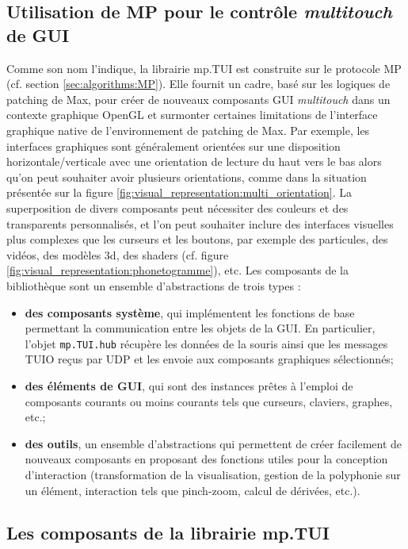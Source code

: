 \subsection{Utilisation de MP pour le contrôle \textit{multitouch} de GUI}

\noindent Comme son nom l'indique, la librairie mp.TUI est construite sur le protocole MP (cf. section \ref{sec:algorithms:MP}). Elle fournit un cadre, basé sur les logiques de patching de Max, pour créer de nouveaux composants \gls{GUI} \textit{multitouch} dans un contexte graphique OpenGL et surmonter certaines limitations de l'interface graphique native de l'environnement de patching de Max. Par exemple, les interfaces graphiques sont généralement orientées sur une disposition horizontale/verticale avec une orientation de lecture du haut vers le bas alors qu'on peut souhaiter avoir plusieurs orientations, comme dans la situation présentée sur la figure \ref{fig:visual_representation:multi_orientation}. La superposition de divers composants peut nécessiter des couleurs et des transparents personnalisés, et l'on peut souhaiter inclure des interfaces visuelles plus complexes que les curseurs et les boutons, par exemple des particules, des vidéos, des modèles 3d, des shaders (cf. figure \ref{fig:visual_representation:phonetogramme}), etc. Les composants de la bibliothèque sont un ensemble d'abstractions de trois types :
\vspace{-1em}
\begin{itemize}[noitemsep]
	\item \textbf{des composants système}, qui implémentent les fonctions de base permettant la communication entre les objets de la \gls{GUI}. En particulier, l'objet \verb|mp.TUI.hub| récupère les données de la souris ainsi que les messages \gls{TUIO} reçus par \gls{UDP} et les envoie aux composants graphiques sélectionnés;
	\item \textbf{des éléments de GUI}, qui sont des instances prêtes à l'emploi de composants courants ou moins courants tels que curseurs, claviers, graphes, etc.;
	\item \textbf{des outils}, un ensemble d'abstractions qui permettent de créer facilement de nouveaux composants en proposant des fonctions utiles pour la conception d'interaction (transformation de la visualisation, gestion de la polyphonie sur un élément, interaction tels que pinch-zoom, calcul de dérivées, etc.).
\end{itemize}

\subsection{Les composants de la librairie mp.TUI}


